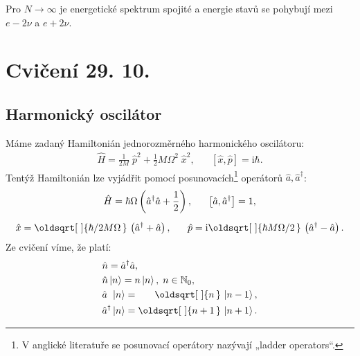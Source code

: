 \documentclass[10pt,a4paper]{article}
\renewcommand*{\sqrt}[2][\ ]{\oldsqrt[#1]{#2\,}\,}
\def\vph{\vphantom}
\def\hph{\hphantom}
\newcommand{\comm}[2]{\left[ #1, #2 \right]}
\newcommand{\const}[1]{\text{#1}}
\newcommand{\ket}[1]{\left| #1 \right>}
\renewcommand{\i}{\const{i}}
\begin{document}
\noindent Pro $N\to\infty$ je energetické spektrum spojité a energie stavů se pohybují mezi $e-2\nu$ a $e+2\nu$.




\pagebreak

\section{Cvičení 29. 10.}

\subsection{Harmonický oscilátor}
Máme zadaný Hamiltonián jednorozměrného harmonického oscilátoru:
\begin{gather*}
    \hat{H} = \frac{1}{2M} \; \hat{p}^2 + \frac{1}{2} M \Omega^2 \; \hat{x}^2,
    \;\;\;\;\;\;
    \comm{\hat{x}}{\hat{p}} = \i \hbar.
\end{gather*}
Tentýž Hamiltonián lze vyjádřit pomocí posunovacích\footnote{V anglické literatuře se posunovací operátory nazývají „ladder operators“.} operátorů $\hat{a}, \hat{a}^\dagger$:
\begin{gather*}
    \hat{H} = \hbar \Omega \left(
        \hat{a}^\dagger \hat{a} + \frac{1}{2}
    \right),
    \;\;\;\;\;\;
    \comm{\hat{a}}{\hat{a}^\dagger} = 1,
    \\[5pt]
    \hat{x} = \sqrt{\hbar / 2 M \Omega}
    \left( \hat{a}^\dagger + \hat{a} \right),
    \;\;\;\;\;\;
    \hat{p} = \i \sqrt{\hbar M \Omega / 2}
    \left( \hat{a}^\dagger - \hat{a} \right).
\end{gather*}
Ze cvičení víme, že platí:
\begin{align*}
    &\hat{n} = \hat{a}^\dagger \hat{a},
    \\
    &\hat{n} \ket{n} = n \ket{n}, \; n \in \mathbb{N}_0,
    \\
    &\hat{a} \hph{\vph{\hat{a}}^\dagger} \ket{n} = \hph{\vph{n}+1} \sqrt{n} \ket{n-1},
    \\
    &\hat{a}^\dagger \ket{n} = \sqrt{n+1} \ket{n+1}.
\end{align*}
\end{document}

